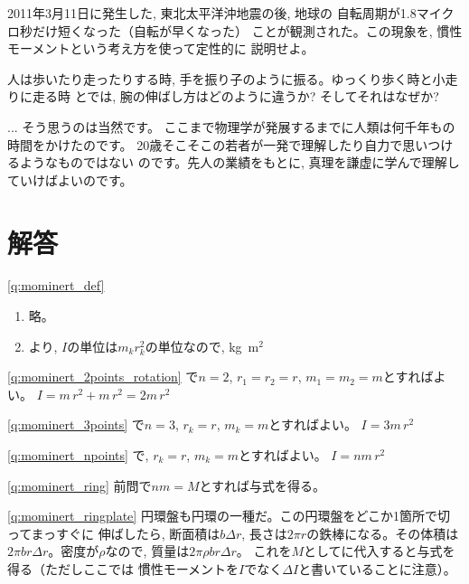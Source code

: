 \begin{q}
%
\begin{q}\label{q:mominert_earthquake}
2011年3月11日に発生した, 東北太平洋沖地震の後, 地球の
自転周期が1.8マイクロ秒だけ短くなった（自転が早くなった）
ことが観測された。この現象を, 慣性モーメントという考え方を使って定性的に
説明せよ。
\end{q}\mv

\begin{exq} 人は歩いたり走ったりする時, 手を振り子のように振る。ゆっくり歩く時と小走りに走る時
とでは, 腕の伸ばし方はどのように違うか? そしてそれはなぜか?\end{exq}

\begin{faq}{\small{} ... そう思うのは当然です。
ここまで物理学が発展するまでに人類は何千年もの時間をかけたのです。
20歳そこそこの若者が一発で理解したり自力で思いつけるようなものではない
のです。先人の業績をもとに, 真理を謙虚に学んで理解していけばよいのです。
}\end{faq}
\hv

\section{解答}
\ref{q:mominert_def}　
\begin{enumerate}
\item 略。
\item {}より, $I$の単位は$m_kr_k^2$の単位なので, kg~m$^2$
\end{enumerate}

\ref{q:mominert_2points_rotation}
で$n=2$, $r_1=r_2=r$, $m_1=m_2=m$とすればよい。
$I=m\,r^2+m^{\,}r^2=2m^{\,}r^2$

\ref{q:mominert_3points}
で$n=3$, $r_k=r$, $m_k=m$とすればよい。
$I=3m\,r^2$

\ref{q:mominert_npoints}
で, $r_k=r$, $m_k=m$とすればよい。
$I=nm\,r^2$

\ref{q:mominert_ring}
前問で$nm=M$とすれば与式を得る。\mv

\ref{q:mominert_ringplate}
円環盤も円環の一種だ。この円環盤をどこか1箇所で切ってまっすぐに
伸ばしたら, 断面積は$b\Delta r$, 長さは$2\pi r$の鉄棒になる。その体積は
$2\pi br \Delta r$。密度が$\rho$なので, 質量は$2\pi\rho br \Delta r$。
これを$M$としてに代入すると与式を得る（ただしここでは
慣性モーメントを$I$でなく$\Delta I$と書いていることに注意）。\mv


\end{q}
